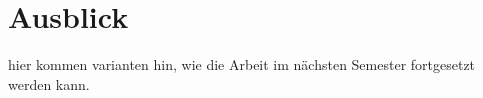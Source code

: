 \chapter{Ausblick}
\begin{Spacing}{\mylinespace}

hier kommen varianten hin, wie die Arbeit im nächsten Semester fortgesetzt werden kann.\\

\end{Spacing}
\newpage
\clearpage
